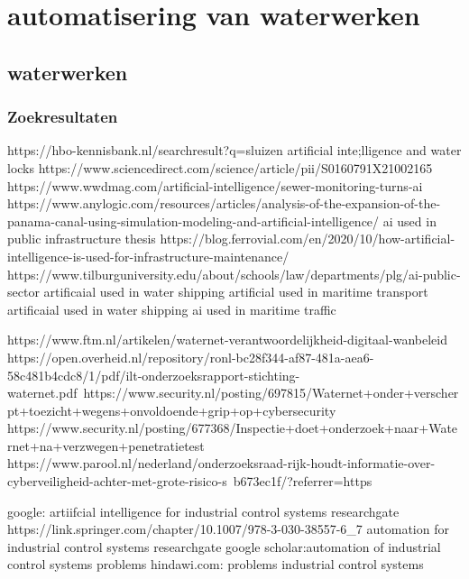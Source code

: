 
\section{automatisering van waterwerken}


\subsection{waterwerken}
\subsubsection{Zoekresultaten}
https://hbo-kennisbank.nl/searchresult?q=sluizen 
artificial inte;lligence and water locks 
https://www.sciencedirect.com/science/article/pii/S0160791X21002165 
https://www.wwdmag.com/artificial-intelligence/sewer-monitoring-turns-ai 
https://www.anylogic.com/resources/articles/analysis-of-the-expansion-of-the-panama-canal-using-simulation-modeling-and-artificial-intelligence/ 
ai used in public infrastructure thesis 
https://blog.ferrovial.com/en/2020/10/how-artificial-intelligence-is-used-for-infrastructure-maintenance/ 
https://www.tilburguniversity.edu/about/schools/law/departments/plg/ai-public-sector 
artificaial used in water shipping 
artificial used in maritime transport 
artificaial used in water shipping 
ai used in maritime traffic 



https://www.ftm.nl/artikelen/waternet-verantwoordelijkheid-digitaal-wanbeleid 
https://open.overheid.nl/repository/ronl-bc28f344-af87-481a-aea6-58c481b4cdc8/1/pdf/ilt-onderzoeksrapport-stichting-waternet.pdf\ 
https://www.security.nl/posting/697815/Waternet+onder+verscherpt+toezicht+wegens+onvoldoende+grip+op+cybersecurity 
https://www.security.nl/posting/677368/Inspectie+doet+onderzoek+naar+Waternet+na+verzwegen+penetratietest 
https://www.parool.nl/nederland/onderzoeksraad-rijk-houdt-informatie-over-cyberveiligheid-achter-met-grote-risico-s~b673ec1f/?referrer=https%


google: artiifcial intelligence for industrial control systems researchgate 
https://link.springer.com/chapter/10.1007/978-3-030-38557-6_7 
automation  for industrial control systems 
researchgate 
google scholar:automation of industrial control systems problems 
hindawi.com: problems industrial control systems 